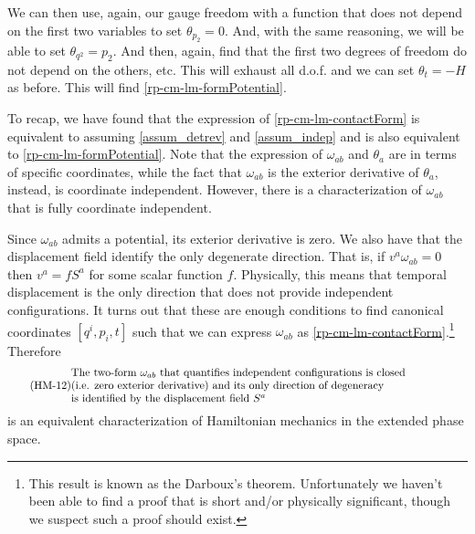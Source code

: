 We can then use, again, our gauge freedom with a function that does not depend on the first two variables to set $\theta_{p_2} = 0$. And, with the same reasoning, we will be able to set $\theta_{q^2} = p_2$. And then, again, find that the first two degrees of freedom do not depend on the others, etc. This will exhaust all d.o.f. and we can set $\theta_t = -H$ as before. This will find \ref{rp-cm-lm-formPotential}.

To recap, we have found that the expression of \ref{rp-cm-lm-contactForm} is equivalent to assuming \ref{assum_detrev} and \ref{assum_indep} and is also equivalent to \ref{rp-cm-lm-formPotential}. Note that the expression of $\omega_{ab}$ and $\theta_a$ are in terms of specific coordinates, while the fact that $\omega_{ab}$ is the exterior derivative of $\theta_a$, instead, is coordinate independent. However, there is a characterization of $\omega_{ab}$ that is fully coordinate independent.

Since $\omega_{ab}$ admits a potential, its exterior derivative is zero. We also have that the displacement field identify the only degenerate direction. That is, if $v^a\omega_{ab} = 0$ then $v^a = f S^a$ for some scalar function $f$. Physically, this means that temporal displacement is the only direction that does not provide independent configurations. It turns out that these are enough conditions to find canonical coordinates $[ q^i, p_i, t]$ such that we can express $\omega_{ab}$ as \ref{rp-cm-lm-contactForm}.\footnote{This result is known as the Darboux's theorem. Unfortunately we haven't been able to find a proof that is short and/or physically significant, though we suspect such a proof should exist.} Therefore
\begin{equation}\label{rp-cm-lm-condSymplecticFormDef}
	\tag{HM-12}
	\parbox{5in}{The two-form $\omega_{ab}$ that quantifies independent configurations is closed \\ (i.e. zero exterior derivative)  and its only direction of degeneracy \\ is identified by the displacement field $S^a$}
\end{equation}
is an equivalent characterization of Hamiltonian mechanics in the extended phase space.

